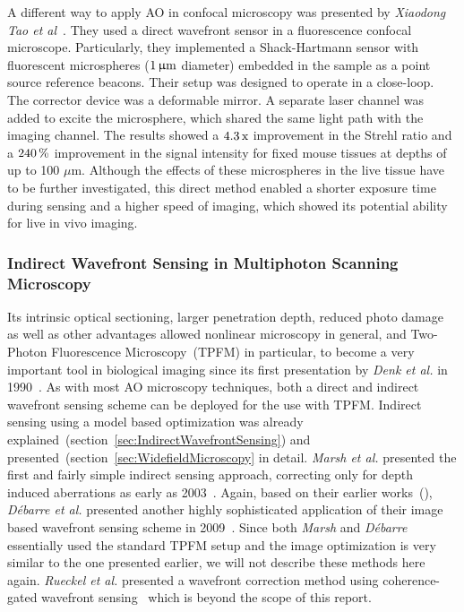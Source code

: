 A different way to apply AO in confocal microscopy was presented by \textit{Xiaodong Tao et al}~\cite{scan_Confocal_direct_sensing}. They used a direct wavefront sensor in a fluorescence confocal microscope. Particularly, they implemented a Shack-Hartmann sensor with fluorescent microspheres ($\unit[1]{\upmu m}$ diameter) embedded in the sample as a point source reference beacons. Their setup was designed to operate in a close-loop. The corrector device was a deformable mirror. A separate laser channel was added to excite the microsphere, which shared the same light path with the imaging channel. The results showed a $\unit[4.3]{\text{x}}$ improvement in the Strehl ratio and a $\unit[240]{\%}$ improvement in the signal intensity for fixed mouse tissues at depths of up to 100 $\mu$m. Although the effects of these microspheres in the live tissue have to be further investigated, this direct method enabled a shorter exposure time during sensing and a higher speed of imaging, which showed its potential ability for live in vivo imaging.


\subsubsection{Indirect Wavefront Sensing in Multiphoton Scanning Microscopy}
\label{sec:MultiphotonScanningMicroscopyUsingIndirektSensing}

Its intrinsic optical sectioning, larger penetration depth, reduced photo damage as well as other advantages allowed nonlinear microscopy in general, and Two-Photon Fluorescence Microscopy~(TPFM) in particular, to become a very important tool in biological imaging since its first presentation by \emph{Denk et al.} in 1990~\cite{scan_TPFM_principle}. As with most AO microscopy techniques, both a direct and indirect wavefront sensing scheme can be deployed for the use with TPFM. Indirect sensing using a model based optimization was already explained~(section~\ref{sec:IndirectWavefrontSensing}) and presented~(section~\ref{sec:WidefieldMicroscopy} in detail. \emph{Marsh et al.} presented the first and fairly simple indirect sensing approach, correcting only for depth induced aberrations as early as 2003~\cite{scan_TPFM_pratical}. Again, based on their earlier works~(\cite{wide_AOM_loew_freq,wide_AOM_structured_illu}), \emph{D\'{e}barre et al.} presented another highly sophisticated application of their image based wavefront sensing scheme in 2009~\cite{scan_TPFM_image_based}. Since both \emph{Marsh} and \emph{D\'{e}barre} essentially used the standard TPFM setup and the image optimization is very similar to the one presented earlier, we will not describe these methods here again. \emph{Rueckel et al.} presented a wavefront correction method using coherence-gated wavefront sensing~\cite{scan_TPFM_gated_wavefront} which is beyond the scope of this report. 


